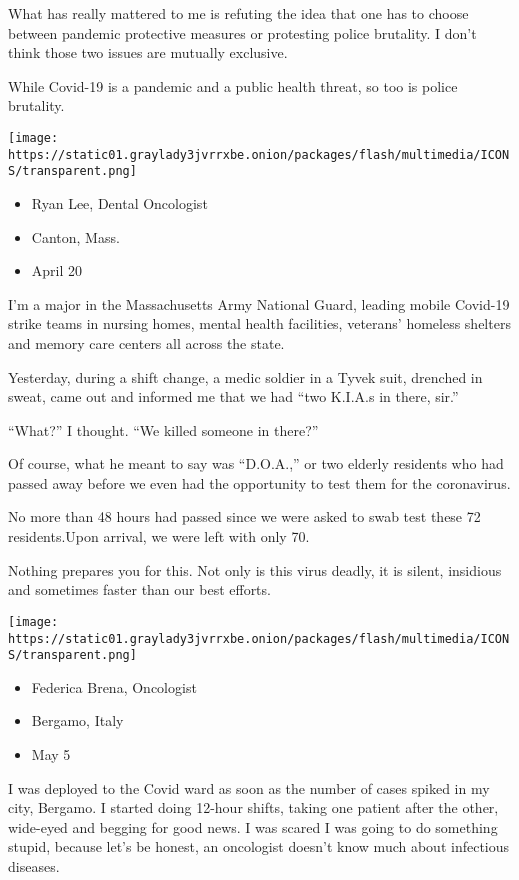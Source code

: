 What has really mattered to me is refuting the idea that one has to
choose between pandemic protective measures or protesting police
brutality. I don't think those two issues are mutually exclusive.

While Covid-19 is a pandemic and a public health threat, so too is
police brutality.

\texttt{[image: https://static01.graylady3jvrrxbe.onion/packages/flash/multimedia/ICONS/transparent.png]}

\begin{itemize}
\tightlist
\item
  Ryan Lee, Dental Oncologist
\item
  Canton, Mass.
\item
  April 20
\end{itemize}

I'm a major in the Massachusetts Army National Guard, leading mobile
Covid-19 strike teams in nursing homes, mental health facilities,
veterans' homeless shelters and memory care centers all across the
state.

Yesterday, during a shift change, a medic soldier in a Tyvek suit,
drenched in sweat, came out and informed me that we had ``two K.I.A.s in
there, sir.''

``What?'' I thought. ``We killed someone in there?''

Of course, what he meant to say was ``D.O.A.,'' or two elderly residents
who had passed away before we even had the opportunity to test them for
the coronavirus.

No more than 48 hours had passed since we were asked to swab test these
72 residents.Upon arrival, we were left with only 70.

Nothing prepares you for this. Not only is this virus deadly, it is
silent, insidious and sometimes faster than our best efforts.

\texttt{[image: https://static01.graylady3jvrrxbe.onion/packages/flash/multimedia/ICONS/transparent.png]}

\begin{itemize}
\tightlist
\item
  Federica Brena, Oncologist
\item
  Bergamo, Italy
\item
  May 5
\end{itemize}

I was deployed to the Covid ward as soon as the number of cases spiked
in my city, Bergamo. I started doing 12-hour shifts, taking one patient
after the other, wide-eyed and begging for good news. I was scared I was
going to do something stupid, because let's be honest, an oncologist
doesn't know much about infectious diseases.

